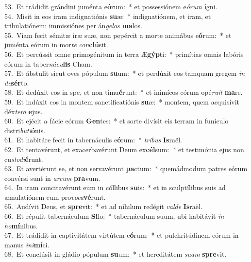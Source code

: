 {53.~}Et trádidit grándini juménta e\textbf{ó}rum:~* et possessiónem e\textit{ó}\textit{rum} \textbf{i}gni.\\
{54.~}Misit in eos iram indignatiónis \textbf{su}æ:~* indignatiónem, et iram, et tribulatiónem: immissiónes per án\textit{ge}\textit{los} \textbf{ma}los.\\
{55.~}Viam fecit sémitæ iræ suæ, non pepércit a morte animábus e\textbf{ó}rum:~* et juménta eórum in mor\textit{te} \textit{con}\textbf{clú}sit.\\
{56.~}Et percússit omne primogénitum in terra Æ\textbf{gýp}ti:~* primítias omnis labóris eórum in taber\textit{ná}\textit{cu}\textbf{lis} Cham.\\
{57.~}Et ábstulit sicut oves pópulum \textbf{su}um:~* et perdúxit eos tamquam gregem \textit{in} \textit{de}\textbf{sér}to.\\
{58.~}Et dedúxit eos in spe, et non timu\textbf{é}runt:~* et inimícos eórum opé\textit{ru}\textit{it} \textbf{ma}re.\\
{59.~}Et indúxit eos in montem sanctificatiónis \textbf{su}æ:~* montem, quem acquisívit déx\textit{te}\textit{ra} \textbf{e}jus.\\
{60.~}Et ejécit a fácie eórum \textbf{Gen}tes:~* et sorte divísit eis terram in funículo distri\textit{bu}\textit{ti}\textbf{ó}nis.\\
{61.~}Et habitáre fecit in tabernáculis e\textbf{ó}rum:~* \textit{tri}\textit{bus} \textbf{Is}raël.\\
{62.~}Et tentavérunt, et exacerbavérunt Deum ex\textbf{cél}sum:~* et testimónia ejus non cu\textit{sto}\textit{di}\textbf{é}runt.\\
{63.~}Et avertérunt se, et non servavérunt \textbf{pa}ctum:~* quemádmodum patres eórum convérsi sunt in \textit{ar}\textit{cum} \textbf{pra}vum.\\
{64.~}In iram concitavérunt eum in cóllibus \textbf{su}is:~* et in sculptílibus suis ad æmulatiónem eum pro\textit{vo}\textit{ca}\textbf{vé}runt.\\
{65.~}Audívit Deus, et \textbf{spre}vit:~* et ad níhilum redégit \textit{val}\textit{de} \textbf{Is}raël.\\
{66.~}Et répulit tabernáculum \textbf{Si}lo:~* tabernáculum suum, ubi habitávit \textit{in} \textit{ho}\textbf{mí}nibus.\\
{67.~}Et trádidit in captivitátem virtútem e\textbf{ó}rum:~* et pulchritúdinem eórum in manus \textit{i}\textit{ni}\textbf{mí}ci.\\
{68.~}Et conclúsit in gládio pópulum \textbf{su}um:~* et hereditátem \textit{su}\textit{am} \textbf{spre}vit.\\

